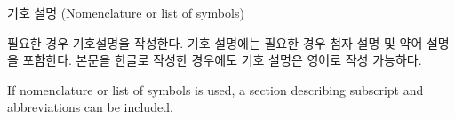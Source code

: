 \documentclass[11pt]{report}
\numberwithin{figure}{chapter}
\theoremstyle{plain}
\theoremstyle{definition}
\theoremstyle{corollary}
\theoremstyle{definition}
\theoremstyle{plain}
\theoremstyle{definition}
\theoremstyle{plain}
\begin{document}
\renewcommand{\contentsname}{목차 (Table of Contents)}

\renewcommand{\listtablename}{표 목차 (List of Tables)}

\renewcommand{\listfigurename}{그림 목차 (List of Figures)}

\newpage
\begin{center}
\large
기호 설명 (Nomenclature or list of symbols)
\end{center}
\normalsize
필요한 경우 기호설명을 작성한다.
기호 설명에는 필요한 경우 첨자 설명 및 약어 설명을 포함한다.
본문을 한글로 작성한 경우에도 기호 설명은 영어로 작성 가능하다.

If nomenclature or list of symbols is used, a section describing subscript and abbreviations can be included. 
\end{document}
